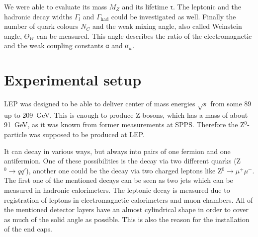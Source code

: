 \documentclass[epj,nopacs]{svjour}
\begin{document}
We were able to evaluate its mass $M_Z$ and its lifetime τ. The leptonic and
the hadronic decay widths $Γ_l$ and $Γ_{\mathrm{had}}$ could be investigated as
well. Finally
the number of quark colours $N_C$ and the weak mixing angle, also
called Weinstein angle, $\Theta_W$ can be measured. This angle describes the
ratio of the electromagnetic and the weak coupling constants α and α$_w$.

\section{ Experimental setup}

LEP was designed to be able to deliver center of mass energies $\sqrt{s}$ from
some 89 up to \SI{209}{\giga\electronvolt}. This is enough to produce Z-bosons,
which has a mass of about \SI{91}{\giga\electronvolt}, as it was
known from former measurements at SPPS. Therefore the Z$^0$-particle was
supposed to be produced at LEP.

It can decay in various ways, but always into pairs of one
fermion and one antifermion. One of these possibilities is the decay via two
different quarks (Z$^0→qq'$), another one could be the decay via two
charged leptons like Z$^0→ μ^+μ^-$. The first one of the mentioned decays can be
seen as two jets which can be measured in hadronic calorimeters. The leptonic
decay is measured due to registration of leptons in electromagnetic
calorimeters and muon chambers. All of the mentioned
detector layers have an almost cylindrical shape in order to
cover as much of the solid angle as possible. This is also the reason for the
installation of the end caps.
\end{document}

